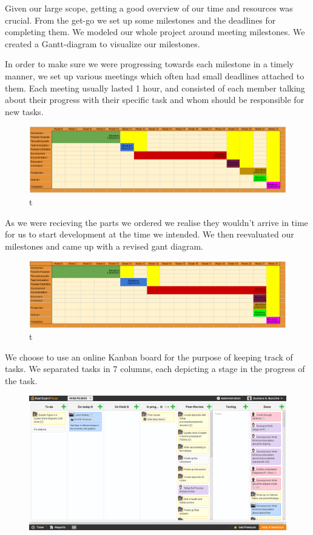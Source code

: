 Given our large scope, getting a good overview of our time and resources was crucial. From the get-go we set up some milestones and the deadlines for completing them. We modeled our whole project around meeting milestones. We created a Gantt-diagram to visualize our milestones.

In order to make sure we were progressing towards each milestone in a timely manner, we set up various meetings which often had small deadlines attached to them. Each meeting usually lasted 1 hour, and consisted of each member talking about their progress with their specific task and whom should be responsible for new tasks.

\begin{figure}[H]
	\centering
	\includegraphics[scale=.35]{images/gantt1.png}
	\caption{t}
\end{figure}

As we were recieving the parts we ordered we realise they wouldn't arrive in time for us to start development at the time we intended. We then reevaluated our milestones and came up with a revised gant diagram.

\begin{figure}[H]
	\centering
	\includegraphics[scale=.35]{images/gantt2.png}
	\caption{t}
\end{figure}

We choose to use an online Kanban board for the purpose of keeping track of tasks. We separated tasks in 7 columns, each depicting a stage in the progress of the task.

\begin{figure}[H]
	\centering
	\includegraphics[scale=.35]{images/kanban.png}
\end{figure}

